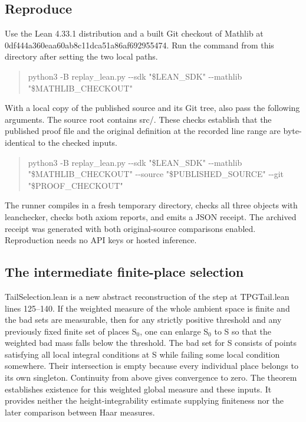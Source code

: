 \documentclass[11pt,letterpaper]{article}
\begin{document}
\subsection{Reproduce}
Use the Lean 4.33.1 distribution and a built Git checkout of Mathlib at {\ttfamily\small 0df444a360eaa6\allowbreak{}0ab8c11dca51a8\allowbreak{}6af692955474}. Run the command from this directory after setting the two local paths.

\begin{quote}\raggedright\setlength{\parskip}{1pt}
{\ttfamily\small python3 -\allowbreak{}B replay\_\allowbreak{}lean.\allowbreak{}py -\allowbreak{}-\allowbreak{}sdk "\$LEAN\_\allowbreak{}SDK" -\allowbreak{}-\allowbreak{}mathlib "\$MATHLIB\_\allowbreak{}CHECKOUT"}\par
\end{quote}
With a local copy of the published source and its Git tree, also pass the following arguments. The source root contains src/. These checks establish that the published proof file and the original definition at the recorded line range are byte-identical to the checked inputs.

\begin{quote}\raggedright\setlength{\parskip}{1pt}
{\ttfamily\small python3 -\allowbreak{}B replay\_\allowbreak{}lean.\allowbreak{}py -\allowbreak{}-\allowbreak{}sdk "\$LEAN\_\allowbreak{}SDK" -\allowbreak{}-\allowbreak{}mathlib "\$MATHLIB\_\allowbreak{}CHECKOUT"   -\allowbreak{}-\allowbreak{}source "\$PUBLISHED\_\allowbreak{}SOURCE" -\allowbreak{}-\allowbreak{}git "\$PROOF\_\allowbreak{}CHECKOUT"}\par
\end{quote}
The runner compiles in a fresh temporary directory, checks all three objects with leanchecker, checks both axiom reports, and emits a JSON receipt. The archived receipt was generated with both original-source comparisons enabled. Reproduction needs no API keys or hosted inference.

\subsection{The intermediate finite-place selection}
TailSelection.lean is a new abstract reconstruction of the step at TPGTail.lean lines 125–140. If the weighted measure of the whole ambient space is finite and the bad sets are measurable, then for any strictly positive threshold and any previously fixed finite set of places S\ensuremath{{}_{0}}, one can enlarge S\ensuremath{{}_{0}} to S so that the weighted bad mass falls below the threshold. The bad set for S consists of points satisfying all local integral conditions at S while failing some local condition somewhere. Their intersection is empty because every individual place belongs to its own singleton. Continuity from above gives convergence to zero. The theorem establishes existence for this weighted global measure and these inputs. It provides neither the height-integrability estimate supplying finiteness nor the later comparison between Haar measures.
\end{document}
